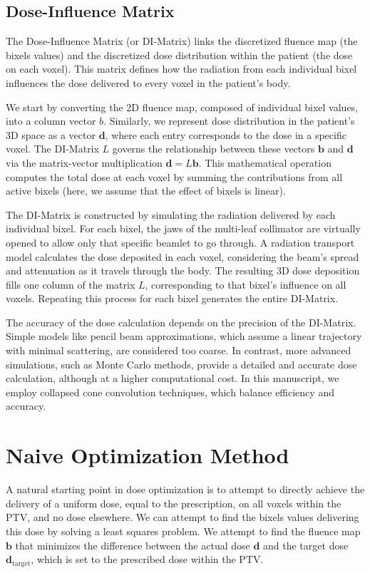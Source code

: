 \subsection[DI-Matrix]{Dose-Influence Matrix}
The Dose-Influence Matrix (or DI-Matrix) links the discretized fluence map (the bixels values) and the discretized dose distribution within the patient (the dose on each voxel).
This matrix defines how the radiation from each individual bixel influences the dose delivered to every voxel in the patient's body.

We start by converting the 2D fluence map, composed of individual bixel values, into a column vector $b$.
Similarly, we represent dose distribution in the patient's 3D space as a vector $\mathbf{d}$, where each entry corresponds to the dose in a specific voxel.
The DI-Matrix $L$ governs the relationship between these vectors $\mathbf{b}$ and $\mathbf{d}$ via the matrix-vector multiplication $\mathbf{d} = L\mathbf{b}$.
This mathematical operation computes the total dose at each voxel by summing the contributions from all active bixels (here, we assume that the effect of bixels is linear).

The DI-Matrix is constructed by simulating the radiation delivered by each individual bixel.
For each bixel, the jaws of the multi-leaf collimator are virtually opened to allow only that specific beamlet to go through.
A radiation transport model calculates the dose deposited in each voxel, considering the beam's spread and attenuation as it travels through the body.
The resulting 3D dose deposition fills one column of the matrix $L$, corresponding to that bixel's influence on all voxels.
Repeating this process for each bixel generates the entire DI-Matrix.

The accuracy of the dose calculation depends on the precision of the DI-Matrix.
Simple models like pencil beam approximations, which assume a linear trajectory with minimal scattering, are considered too coarse.
In contrast, more advanced simulations, such as Monte Carlo methods, provide a detailed and accurate dose calculation, although at a higher computational cost.
In this manuscript, we employ collapsed cone convolution techniques, which balance efficiency and accuracy.

\section{Naive Optimization Method}
A natural starting point in dose optimization is to attempt to directly achieve the delivery of a uniform dose, equal to the prescription, on all voxels within the PTV, and no dose elsewhere.
We can attempt to find the bixels values delivering this dose by solving a least squares problem.
We attempt to find the fluence map $\mathbf{b}$ that minimizes the difference between the actual dose $\mathbf{d}$ and the target dose $\mathbf{d}_{\text{target}}$, which is set to the prescribed dose within the PTV.

